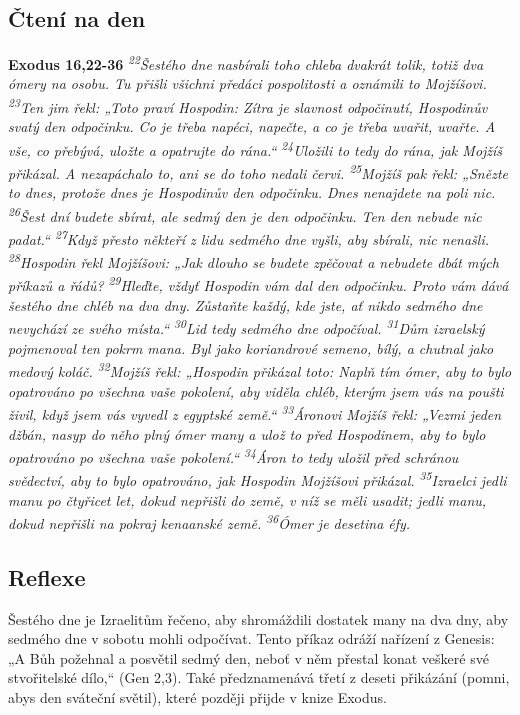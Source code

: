 \documentclass[11pt]{article}
\begin{document}
\subsection*{Čtení na den}
\textbf{Exodus 16,22-36}
\newline
\textit{
\textsuperscript{22}Šestého dne nasbírali toho chleba dvakrát tolik, totiž dva ómery na osobu. Tu přišli všichni předáci pospolitosti a oznámili to Mojžíšovi.
\textsuperscript{23}Ten jim řekl: „Toto praví Hospodin: Zítra je slavnost odpočinutí, Hospodinův svatý den odpočinku. Co je třeba napéci, napečte, a co je třeba uvařit, uvařte. A vše, co přebývá, uložte a opatrujte do rána.“
\textsuperscript{24}Uložili to tedy do rána, jak Mojžíš přikázal. A nezapáchalo to, ani se do toho nedali červi.
\textsuperscript{25}Mojžíš pak řekl: „Snězte to dnes, protože dnes je Hospodinův den odpočinku. Dnes nenajdete na poli nic.
\textsuperscript{26}Šest dní budete sbírat, ale sedmý den je den odpočinku. Ten den nebude nic padat.“
\textsuperscript{27}Když přesto někteří z lidu sedmého dne vyšli, aby sbírali, nic nenašli.
\textsuperscript{28}Hospodin řekl Mojžíšovi: „Jak dlouho se budete zpěčovat a nebudete dbát mých příkazů a řádů?
\textsuperscript{29}Hleďte, vždyť Hospodin vám dal den odpočinku. Proto vám dává šestého dne chléb na dva dny. Zůstaňte každý, kde jste, ať nikdo sedmého dne nevychází ze svého místa.“
\textsuperscript{30}Lid tedy sedmého dne odpočíval.
\textsuperscript{31}Dům izraelský pojmenoval ten pokrm mana. Byl jako koriandrové semeno, bílý, a chutnal jako medový koláč.
\textsuperscript{32}Mojžíš řekl: „Hospodin přikázal toto: Naplň tím ómer, aby to bylo opatrováno po všechna vaše pokolení, aby viděla chléb, kterým jsem vás na poušti živil, když jsem vás vyvedl z egyptské země.“
\textsuperscript{33}Áronovi Mojžíš řekl: „Vezmi jeden džbán, nasyp do něho plný ómer many a ulož to před Hospodinem, aby to bylo opatrováno po všechna vaše pokolení.“
\textsuperscript{34}Áron to tedy uložil před schránou svědectví, aby to bylo opatrováno, jak Hospodin Mojžíšovi přikázal.
\textsuperscript{35}Izraelci jedli manu po čtyřicet let, dokud nepřišli do země, v níž se měli usadit; jedli manu, dokud nepřišli na pokraj kenaanské země.
\textsuperscript{36}Ómer je desetina éfy.
}

\subsection*{Reflexe}
Šestého dne je Izraelitům řečeno, aby shromáždili dostatek many na dva dny, aby sedmého dne v sobotu mohli
odpočívat. Tento příkaz odráží nařízení z Genesis: „A Bůh požehnal a posvětil sedmý den, neboť v něm přestal konat
veškeré své stvořitelské dílo,“ (Gen 2,3). Také předznamenává třetí z deseti přikázání (pomni, abys den sváteční světil),
které později přijde v knize Exodus.
\end{document}
